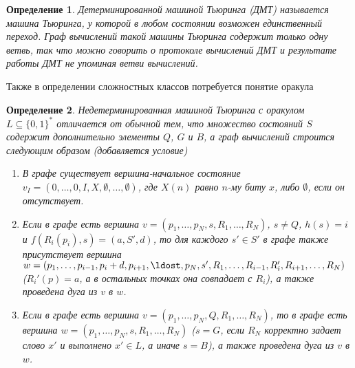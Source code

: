 \documentclass[14pt, a4paper]{extreport}
\newtheorem{definition}{\indent Определение}
\newcommand{\word}{\{0, 1\}^*}
\begin{document}
\begin{definition}
    Детерминированной машиной Тьюринга (ДМТ) называется машина Тьюринга, у которой в любом состоянии возможен единственный переход. Граф вычислений такой машины Тьюринга содержит только одну ветвь, так что можно говорить о протоколе вычислений ДМТ и результате работы ДМТ не упоминая ветви вычислений.
\end{definition}
Также в определении сложностных классов потребуется понятие оракула
\begin{definition}
    Недетерминированная машиной Тьюринга с оракулом $L \subseteq \word$ отличается от обычной тем, что множество состояний $S$ содержит дополнительно элементы $Q$, $G$ и $B$, а граф вычислений строится следующим образом (добавляется условие)
    \begin{enumerate}
        \item В графе существует вершина-начальное состояние $v_I = \left(0, \ldots, 0, I, X, \emptyset, \ldots, \emptyset\right)$, где $X(n)$ равно $n$-му биту $x$, либо $\emptyset$, если он отсутствует.
        \item Если в графе есть вершина $v = \left(p_1, \ldots, p_N, s, R_1, \ldots, R_N\right)$, $s \neq Q$, $h(s) = i$ и $f(R_i(p_i), s) = (a, S', d)$, то для каждого $s' \in S'$ в графе также присутствует вершина $w = \left(p_1, \ldots, p_{i-1}, p_i + d, p_{i+1}, \ldost, p_N, s', R_1, \ldots, R_{i-1}, R'_i, R_{i+1}, \ldots, R_N\right)$ ($R_i'(p) = a$, а в остальных точках она совпадает с $R_i$), а также проведена дуга из $v$ в $w$.
        \item Если в графе есть вершина $v = \left(p_1, \ldots, p_N, Q, R_1, \ldots, R_N\right)$, то в графе есть вершина $w = \left(p_1, \ldots, p_N, s, R_1, \ldots, R_N\right)$ ($s = G$, если $R_N$ корректно задает слово $x'$ и выполнено $x' \in L$, а иначе $s = B$), а также проведена дуга из $v$ в $w$.

    \end{enumerate}

\end{definition}
\end{document}

